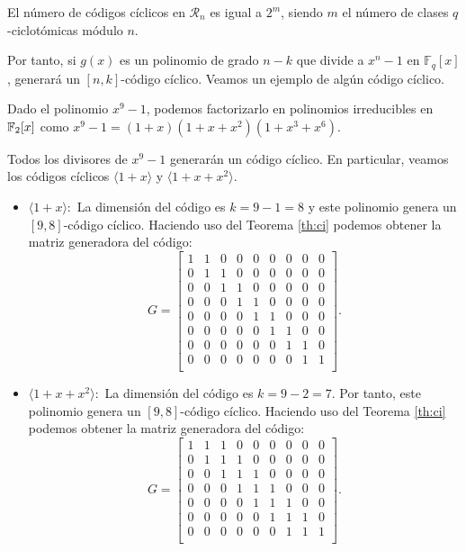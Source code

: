 \begin{corolario}
El número de códigos cíclicos en $\mathcal{R}_n$ es igual a $2^m$, siendo $m$ el número de clases $q$-ciclotómicas módulo $n$.
\end{corolario}

Por tanto, si $g(x)$ es un polinomio de grado $n-k$ que divide a $x^n - 1$ en $\mathbb{F}_q[x]$, generará un $[n,k]$-código cíclico. Veamos un ejemplo de algún código cíclico.

\begin{ejemplo}
Dado el polinomio $x^9 - 1$, podemos factorizarlo en polinomios irreducibles en $\mathbb{F}_2[x]$ como $x^9 - 1 = (1 + x)(1 + x + x^2)(1 + x^3 + x^6)$.

Todos los divisores de $x^9 - 1$ generarán un código cíclico. En particular, veamos los códigos cíclicos $ \langle 1 + x\rangle$ y $ \langle 1 + x + x^2 \rangle$.

\begin{itemize}
    \item $\langle 1 + x \rangle:$ La dimensión del código es $k = 9 - 1 = 8$ y este polinomio genera un $[9,8]$-código cíclico. Haciendo uso del Teorema \ref{th:ci} podemos obtener la matriz generadora del código:
    $$ G = \left[\begin{array}{ccccccccc}
        1&1&0&0&0&0&0&0&0\\
        0&1&1&0&0&0&0&0&0\\
        0&0&1&1&0&0&0&0&0\\
        0&0&0&1&1&0&0&0&0\\
        0&0&0&0&1&1&0&0&0\\
        0&0&0&0&0&1&1&0&0\\
        0&0&0&0&0&0&1&1&0\\
        0&0&0&0&0&0&0&1&1\\
    \end{array}\right].$$
    \item $\langle 1 + x + x^2 \rangle:$ La dimensión del código es $k = 9 - 2 = 7$. Por tanto, este polinomio genera un $[9,8]$-código cíclico. Haciendo uso del Teorema \ref{th:ci} podemos obtener la matriz generadora del código:
    $$ G = \left[\begin{array}{ccccccccc}
        1&1&1&0&0&0&0&0&0\\
        0&1&1&1&0&0&0&0&0\\
        0&0&1&1&1&0&0&0&0\\
        0&0&0&1&1&1&0&0&0\\
        0&0&0&0&1&1&1&0&0\\
        0&0&0&0&0&1&1&1&0\\
        0&0&0&0&0&0&1&1&1\\
    \end{array}\right].$$
\end{itemize}
\end{ejemplo}

